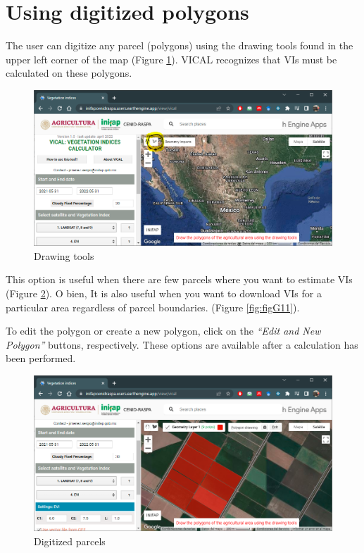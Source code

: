 \documentclass[
]{book}
\begin{document}
\hypertarget{using-digitized-polygons}{%
\section{Using digitized polygons}\label{using-digitized-polygons}}

The user can digitize any parcel (polygons) using the drawing tools found in the upper left corner of the map (Figure \ref{fig:figG9}). VICAL recognizes that VIs must be calculated on these polygons.

\begin{figure}

{\centering \includegraphics[width=0.75\linewidth]{./images/Figure11} 

}

\caption{Drawing tools}\label{fig:figG9}
\end{figure}

This option is useful when there are few parcels where you want to estimate VIs (Figure \ref{fig:figG10}). O bien, It is also useful when you want to download VIs for a particular area regardless of parcel boundaries. (Figure \ref{fig:figG11}).

To edit the polygon or create a new polygon, click on the \emph{``Edit and New Polygon''} buttons, respectively. These options are available after a calculation has been performed.

\begin{figure}

{\centering \includegraphics[width=0.75\linewidth]{./images/Figure12} 

}

\caption{Digitized parcels}\label{fig:figG10}
\end{figure}
\end{document}
